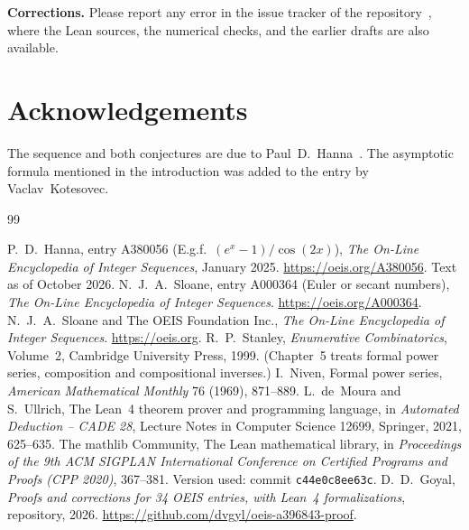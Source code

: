\documentclass[11pt,a4paper]{article}
\theoremstyle{definition}
\theoremstyle{remark}
\newcommand{\para}[1]{\par\medskip\noindent\textbf{#1}\enspace}
\begin{document}
\para{Corrections.} Please report any error in the issue tracker of the repository~\cite{repo}, where the Lean
sources, the numerical checks, and the earlier drafts are also available.

\section*{Acknowledgements}
The sequence and both conjectures are due to Paul~D.~Hanna~\cite{oeis}. The asymptotic formula mentioned in the
introduction was added to the entry by Vaclav~Kotesovec.

\begin{thebibliography}{99}\small
\raggedright
{} P.~D.~Hanna, entry A380056 (E.g.f.\ $(e^x-1)/\cos(2x)$), \emph{The On-Line Encyclopedia of Integer Sequences}, January 2025. \url{https://oeis.org/A380056}. Text as of October 2026.
 N.~J.~A.~Sloane, entry A000364 (Euler or secant numbers), \emph{The On-Line Encyclopedia of Integer Sequences}. \url{https://oeis.org/A000364}.
 N.~J.~A.~Sloane and The OEIS Foundation Inc., \emph{The On-Line Encyclopedia of Integer Sequences}. \url{https://oeis.org}.
 R.~P.~Stanley, \emph{Enumerative Combinatorics}, Volume~2, Cambridge University Press, 1999. (Chapter~5 treats formal power series, composition and compositional inverses.)
 I.~Niven, Formal power series, \emph{American Mathematical Monthly} 76 (1969), 871--889.
 L.~de~Moura and S.~Ullrich, The Lean~4 theorem prover and programming language, in \emph{Automated Deduction -- CADE 28}, Lecture Notes in Computer Science 12699, Springer, 2021, 625--635.
 The mathlib Community, The Lean mathematical library, in \emph{Proceedings of the 9th ACM SIGPLAN International Conference on Certified Programs and Proofs (CPP 2020)}, 367--381. Version used: commit \texttt{c44e0c8ee63c}.
 D.~D.~Goyal, \emph{Proofs and corrections for 34 OEIS entries, with Lean~4 formalizations}, repository, 2026. \url{https://github.com/dvgyl/oeis-a396843-proof}.
\end{thebibliography}
\end{document}
